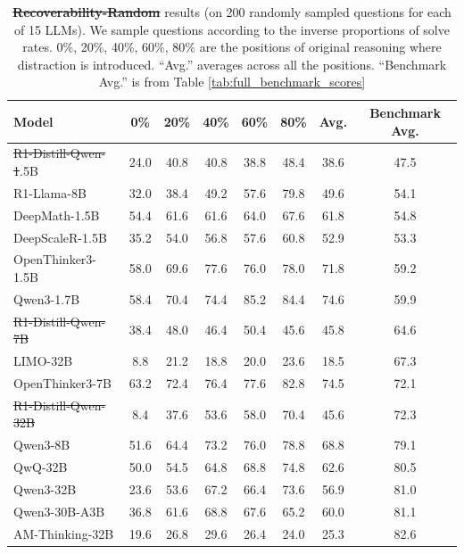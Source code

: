 \documentclass{article} %
\providecommand{\DIFaddtex}[1]{{\protect\color{blue}\uwave{#1}}} %
\providecommand{\DIFdeltex}[1]{{\protect\color{red}\sout{#1}}}                      %
\providecommand{\DIFaddFL}[1]{\DIFadd{#1}} %
\providecommand{\DIFdelFL}[1]{\DIFdel{#1}} %
\providecommand{\DIFaddbeginFL}{} %
\providecommand{\DIFaddendFL}{} %
\providecommand{\DIFdelbeginFL}{} %
\providecommand{\DIFdelendFL}{} %
\providecommand{\DIFadd}[1]{\texorpdfstring{\DIFaddtex{#1}}{#1}} %
\providecommand{\DIFdel}[1]{\texorpdfstring{\DIFdeltex{#1}}{}} %
\newcommand{\DIFscaledelfig}{0.5}
\newlength{\DIFdelgraphicswidth} %
\newlength{\DIFdelgraphicsheight} %
\newcommand{\DIFaddincludegraphics}[2][]{{\color{blue}\fbox{\DIFOincludegraphics[#1]{#2}}}} %
\newcommand{\DIFdelincludegraphics}[2][]{%
\sbox{\DIFdelgraphicsbox}{\DIFOincludegraphics[#1]{#2}}%
\settoboxwidth{\DIFdelgraphicswidth}{\DIFdelgraphicsbox} %
\settoboxtotalheight{\DIFdelgraphicsheight}{\DIFdelgraphicsbox} %
\scalebox{\DIFscaledelfig}{%
\parbox[b]{\DIFdelgraphicswidth}{\usebox{\DIFdelgraphicsbox}\\[-\baselineskip] \rule{\DIFdelgraphicswidth}{0em}}\llap{\resizebox{\DIFdelgraphicswidth}{\DIFdelgraphicsheight}{%
\setlength{\unitlength}{\DIFdelgraphicswidth}%
\begin{picture}(1,1)%
\thicklines\linethickness{2pt} %
{\color[rgb]{1,0,0}\put(0,0){\framebox(1,1){}}}%
{\color[rgb]{1,0,0}\put(0,0){\line( 1,1){1}}}%
{\color[rgb]{1,0,0}\put(0,1){\line(1,-1){1}}}%
\end{picture}%
}\hspace*{3pt}}} %
} %
\DeclareRobustCommand{\DIFaddbeginFL}{\DIFOaddbeginFL \let\includegraphics\DIFaddincludegraphics} %
\DeclareRobustCommand{\DIFaddendFL}{\DIFOaddendFL \let\includegraphics\DIFOincludegraphics} %
\DeclareRobustCommand{\DIFdelbeginFL}{\DIFOdelbeginFL \let\includegraphics\DIFdelincludegraphics} %
\DeclareRobustCommand{\DIFdelendFL}{\DIFOaddendFL \let\includegraphics\DIFOincludegraphics} %
\begin{document}
\begin{table}[ht!]
  \centering
  \begin{tabular}{lcccccc|c}
    \toprule
    \textbf{Model} & \textbf{0\%} & \textbf{20\%} & \textbf{40\%} & \textbf{60\%} & \textbf{80\%} & \textbf{Avg.} & \textbf{Benchmark Avg.} \\
    \midrule
    \DIFdelbeginFL \DIFdelFL{R1-Distill-Qwen-1}\DIFdelendFL \DIFaddbeginFL \DIFaddFL{R1-Qwen-1}\DIFaddendFL .5B    & 24.0 & 40.8 & 40.8 & 38.8 & 48.4 & 38.6 & 47.5 \\
    R1-Llama-8B             & 32.0 & 38.4 & 49.2 & 57.6 & 79.8 & 49.6 & 54.1 \\
    DeepMath-1.5B           & 54.4 & 61.6 & 61.6 & 64.0 & 67.6 & 61.8 & 54.8 \\
    DeepScaleR-1.5B         & 35.2 & 54.0 & 56.8 & 57.6 & 60.8 & 52.9 & 53.3 \\
    OpenThinker3-1.5B       & 58.0 & 69.6 & 77.6 & 76.0 & 78.0 & 71.8 & 59.2 \\
    Qwen3-1.7B              & 58.4 & 70.4 & 74.4 & 85.2 & 84.4 & 74.6 & 59.9 \\
    \midrule
    \DIFdelbeginFL \DIFdelFL{R1-Distill-Qwen-7B      }\DIFdelendFL \DIFaddbeginFL \DIFaddFL{R1-Qwen-7B      }\DIFaddendFL & 38.4 & 48.0 & 46.4 & 50.4 & 45.6 & 45.8 & 64.6 \\
    LIMO-32B                & 8.8 & 21.2 & 18.8 & 20.0 & 23.6 & 18.5 & 67.3 \\
    OpenThinker3-7B         & 63.2 & 72.4 & 76.4 & 77.6 & 82.8 & 74.5 & 72.1 \\
    \DIFdelbeginFL \DIFdelFL{R1-Distill-Qwen-32B     }\DIFdelendFL \DIFaddbeginFL \DIFaddFL{R1-Qwen-32B     }\DIFaddendFL & 8.4 & 37.6 & 53.6 & 58.0 & 70.4 & 45.6 & 72.3 \\
    \midrule
    Qwen3-8B                & 51.6 &  64.4 & 73.2 & 76.0 & 78.8 & 68.8 & 79.1 \\
    QwQ-32B                 & 50.0 & 54.5 & 64.8 & 68.8 & 74.8 & 62.6 & 80.5 \\
    Qwen3-32B               & 23.6 & 53.6 & 67.2 & 66.4 & 73.6 & 56.9 & 81.0 \\
    Qwen3-30B-A3B           & 36.8 & 61.6 & 68.8 & 67.6 & 65.2 & 60.0 & 81.1 \\
    AM-Thinking-32B      & 19.6 & 26.8 & 29.6 & 26.4 & 24.0 & 25.3 & 82.6 \\
    \bottomrule
  \end{tabular}
\caption{\DIFdelbeginFL \textbf{\DIFdelFL{Recoverability-Random}} %
\DIFdelendFL \DIFaddbeginFL \textbf{\DIFaddFL{Recoverability (individual)}} \DIFaddendFL results (on 200 randomly sampled questions for each of 15 LLMs). We sample questions according to the inverse proportions of solve rates. 0\%, 20\%, 40\%, 60\%, 80\% are the positions of original reasoning where distraction is introduced. ``Avg.'' averages across all the positions. ``Benchmark Avg.'' is from Table \ref{tab:full_benchmark_scores}}
  \label{tab:recoverability_individual}
\end{table}
\end{document}
